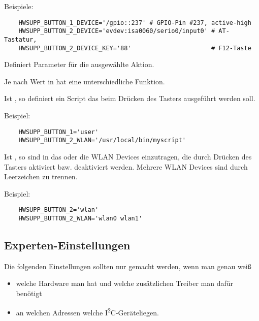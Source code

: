 \begin{description}
  Beispiele:
  \begin{verbatim}
    HWSUPP_BUTTON_1_DEVICE='/gpio::237' # GPIO-Pin #237, active-high
    HWSUPP_BUTTON_2_DEVICE='evdev:isa0060/serio0/input0' # AT-Tastatur,
    HWSUPP_BUTTON_2_DEVICE_KEY='88'                      # F12-Taste
  \end{verbatim}

  Definiert Parameter für die ausgewählte Aktion.
  
  Je nach Wert in   hat 
  eine unterschiedliche Funktion.  

  Ist , so definiert
   ein Script das beim Drücken des Tasters
  ausgeführt werden soll.
  
  Beispiel:
  \begin{verbatim}
    HWSUPP_BUTTON_1='user'
    HWSUPP_BUTTON_2_WLAN='/usr/local/bin/myscript'
  \end{verbatim}

  Ist , so sind in 
   das oder die WLAN Devices  einzutragen, 
  die durch Drücken des Tasters aktiviert bzw. deaktiviert werden.
  Mehrere WLAN Devices sind durch Leerzeichen zu trennen.
  
  Beispiel:
  \begin{verbatim}
    HWSUPP_BUTTON_2='wlan'
    HWSUPP_BUTTON_2_WLAN='wlan0 wlan1'
  \end{verbatim}

\subsection{Experten-Einstellungen}
  Die folgenden Einstellungen sollten nur gemacht werden, wenn man genau weiß
  \begin{itemize}
    \item welche Hardware man hat und welche zusätzlichen Treiber man dafür benötigt
    \item an welchen Adressen welche I\textsuperscript{2}C-Geräte\footnotemark liegen.
    
     

\end{itemize}
\end{description}
